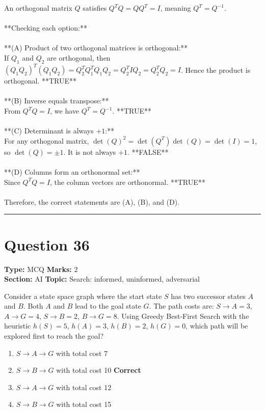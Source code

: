 \documentclass[11pt]{article}
\begin{document}
An orthogonal matrix \(Q\) satisfies \(Q^TQ = QQ^T = I\), meaning \(Q^T = Q^{-1}\).\\
\\
**Checking each option:**\\
\\
**(A) Product of two orthogonal matrices is orthogonal:**\\
If \(Q_1\) and \(Q_2\) are orthogonal, then \((Q_1Q_2)^T(Q_1Q_2) = Q_2^TQ_1^TQ_1Q_2 = Q_2^TIQ_2 = Q_2^TQ_2 = I\). Hence the product is orthogonal. **TRUE**\\
\\
**(B) Inverse equals transpose:**\\
From \(Q^TQ = I\), we have \(Q^T = Q^{-1}\). **TRUE**\\
\\
**(C) Determinant is always \(+1\):**\\
For any orthogonal matrix, \(\det(Q)^2 = \det(Q^T)\det(Q) = \det(I) = 1\), so \(\det(Q) = \pm 1\). It is not always \(+1\). **FALSE**\\
\\
**(D) Columns form an orthonormal set:**\\
Since \(Q^TQ = I\), the column vectors are orthonormal. **TRUE**\\
\\
Therefore, the correct statements are (A), (B), and (D).

\vspace{0.8em}
\hrule
\vspace{0.4em}
\section*{Question 36}
\textbf{Type:} MCQ \hfill \textbf{Marks:} 2\\
\textbf{Section:} AI \hfill \textbf{Topic:} Search: informed, uninformed, adversarial

Consider a state space graph where the start state \(S\) has two successor states \(A\) and \(B\). Both \(A\) and \(B\) lead to the goal state \(G\). The path costs are: \(S \to A = 3\), \(A \to G = 4\), \(S \to B = 2\), \(B \to G = 8\). Using Greedy Best-First Search with the heuristic \(h(S) = 5\), \(h(A) = 3\), \(h(B) = 2\), \(h(G) = 0\), which path will be explored first to reach the goal?


\begin{enumerate}[label=\textbf{\Alph*.}, leftmargin=1.8em]
\item \(S \to A \to G\) with total cost 7\item \(S \to B \to G\) with total cost 10 \hfill {\color{gategreen}\textbf{Correct}}\item \(S \to A \to G\) with total cost 12\item \(S \to B \to G\) with total cost 15\end{enumerate}
\end{document}
